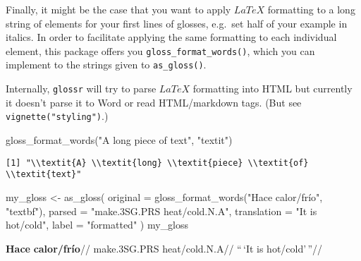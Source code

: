 \documentclass[
  letterpaper,
  DIV=11,
  numbers=noendperiod]{scrartcl}
\newenvironment{Shaded}{\begin{snugshade}}{\end{snugshade}}
\newcommand{\AttributeTok}[1]{\textcolor[rgb]{0.40,0.45,0.13}{#1}}
\newcommand{\FunctionTok}[1]{\textcolor[rgb]{0.28,0.35,0.67}{#1}}
\newcommand{\NormalTok}[1]{\textcolor[rgb]{0.00,0.23,0.31}{#1}}
\newcommand{\OtherTok}[1]{\textcolor[rgb]{0.00,0.23,0.31}{#1}}
\newcommand{\StringTok}[1]{\textcolor[rgb]{0.13,0.47,0.30}{#1}}
\begin{document}
Finally, it might be the case that you want to apply \(LaTeX\)
formatting to a long string of elements for your first lines of glosses,
e.g.~set half of your example in italics. In order to facilitate
applying the same formatting to each individual element, this package
offers you \texttt{gloss\_format\_words()}, which you can implement to
the strings given to \texttt{as\_gloss()}.

Internally, \texttt{glossr} will try to parse \(LaTeX\) formatting into
HTML but currently it doesn't parse it to Word or read HTML/markdown
tags. (But see \texttt{vignette("styling")}.)

\begin{Shaded}
\begin{Highlighting}[]
\FunctionTok{gloss\_format\_words}\NormalTok{(}\StringTok{"A long piece of text"}\NormalTok{, }\StringTok{"textit"}\NormalTok{)}
\end{Highlighting}
\end{Shaded}

\begin{verbatim}
[1] "\\textit{A} \\textit{long} \\textit{piece} \\textit{of} \\textit{text}"
\end{verbatim}

\begin{Shaded}
\begin{Highlighting}[]
\NormalTok{my\_gloss }\OtherTok{\textless{}{-}} \FunctionTok{as\_gloss}\NormalTok{(}
  \AttributeTok{original =} \FunctionTok{gloss\_format\_words}\NormalTok{(}\StringTok{"Hace calor/frío"}\NormalTok{, }\StringTok{"textbf"}\NormalTok{),}
  \AttributeTok{parsed =} \StringTok{"make.3SG.PRS heat/cold.N.A"}\NormalTok{,}
  \AttributeTok{translation =} \StringTok{"\textquotesingle{}It is hot/cold\textquotesingle{}"}\NormalTok{,}
  \AttributeTok{label =} \StringTok{"formatted"}
\NormalTok{)}
\NormalTok{my\_gloss}
\end{Highlighting}
\end{Shaded}


\ex\label{formatted} \begingl \gla \textbf{Hace} \textbf{calor/frío}//
\glb make.3SG.PRS heat/cold.N.A// \glft ``\,`It is hot/cold'\,''//
\endgl \xe
\end{document}
